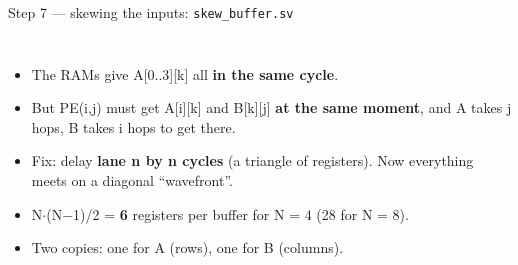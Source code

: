 \documentclass[aspectratio=169,11pt]{beamer}
\newcommand{\file}[1]{\texttt{\textcolor{copper}{#1}}}
\begin{document}
\begin{frame}{Step 7 --- skewing the inputs: \file{skew\_buffer.sv}}
  \begin{columns}[T]
    \small
    \begin{itemize}
      \item The RAMs give A[0..3][k] all \textbf{in the same cycle}.
      \item But PE(i,j) must get A[i][k] and B[k][j] \textbf{at the same moment}, and A takes j hops,
            B takes i hops to get there.
      \item Fix: delay \textbf{lane n by n cycles} (a triangle of registers). Now everything meets
            on a diagonal ``wavefront''.
      \item N$\cdot$(N$-$1)/2 = \textbf{6} registers per buffer for N = 4 (28 for N = 8).
      \item Two copies: one for A (rows), one for B (columns).
    \end{itemize}
  \end{columns}
\end{frame}
\end{document}
